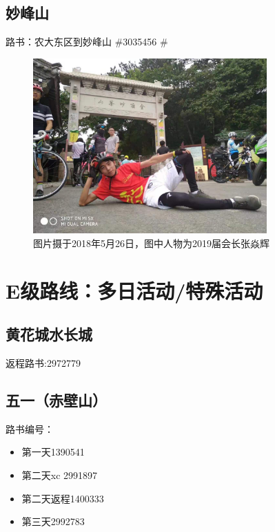\documentclass{ctexbook}
\begin{document}
\subsection{妙峰山}
\label{subsec:妙峰山}
路书：农大东区到妙峰山 \#3035456  \#

\begin{figure}[ht]
    \centering
    \includegraphics[width=0.8\textwidth]{fig/妙峰山1.jpg}
    \caption{图片摄于2018年5月26日，图中人物为2019届会长张焱辉}
\end{figure}

\section{E级路线：多日活动/特殊活动}
\subsection{黄花城水长城}
返程路书:2972779


\subsection{五一（赤壁山）}
路书编号：
\begin{itemize}
    \item 第一天1390541
    \item 第二天xc 2991897
    \item 第二天返程1400333
    \item 第三天2992783
\end{itemize}
\end{document}
